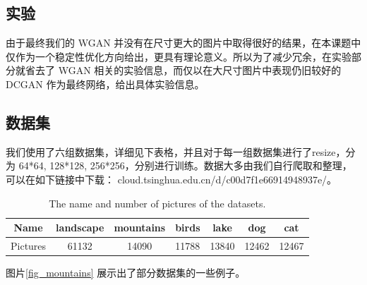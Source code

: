 \documentclass{article}
\begin{document}
\begin{CJK*}{UTF8}{gbsn}
\section{实验}

  由于最终我们的 WGAN 并没有在尺寸更大的图片中取得很好的结果，在本课题中仅作为一个稳定性优化方向给出，更具有理论意义。所以为了减少冗余，在实验部分就省去了 WGAN 相关的实验信息，而仅以在大尺寸图片中表现仍旧较好的 DCGAN 作为最终网络，给出具体实验信息。

  \subsection{数据集}
	我们使用了六组数据集，详细见下表格，并且对于每一组数据集进行了resize，分为 64*64, 128*128, 256*256，分别进行训练。数据大多由我们自行爬取和整理，可以在如下链接中下载： cloud.tsinghua.edu.cn/d/c00d7f1e66914948937e/。
	
	\begin{table}[htbp]
		\begin{center}
			\begin{tabular}{|c|c|c|c|c|c|c|}
				\hline
				Name	  & landscape	& mountains	& birds & lake  & dog   & cat \\
				\hline
				Pictures  &	61132		& 14090     & 11788 & 13840 & 12462 & 12467   \\
				\hline
			\end{tabular}
			\vspace{10pt}
			\caption{The name and number of pictures of the datasets.}
		\end{center}
	\end{table}

	图片\ref{fig_mountains} 展示出了部分数据集的一些例子。
	

\end{CJK*}
\end{document}
